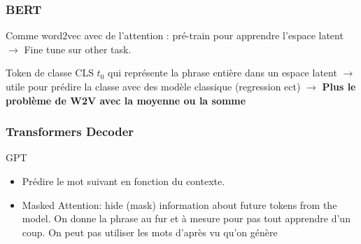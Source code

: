\documentclass{article}
\begin{document}
\begin{multicols}{2}
    \subsubsection{BERT}
    Comme word2vec avec de l'attention : pré-train pour apprendre l'espace latent $\rightarrow$ Fine tune sur other task. 
    
    Token de classe CLS $t_0$ qui représente la phrase entière dans un espace latent $\rightarrow$ utile pour prédire la classe avec des modèle classique (regression ect) $\rightarrow$ \textbf{Plus le problème de W2V avec la moyenne ou la somme}
    
    \subsubsection{Transformers Decoder}
    GPT
    \begin{itemize}
        \item Prédire le mot suivant en fonction du contexte.
        \item Masked Attention: hide (mask) information about future tokens from the model. On donne la phrase au fur et à mesure pour pas tout apprendre d'un coup. On peut pas utiliser les mots d'après vu qu'on génère
    \end{itemize}














\end{multicols}
\end{document}
